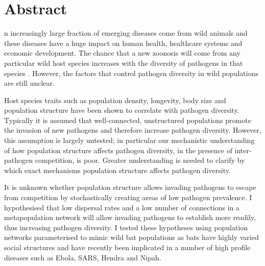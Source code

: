 










\section{Abstract}


n increasingly large fraction of emerging diseases come from wild animals and these diseases have a huge impact on human health, healthcare systems and economic development.
The chance that a new zoonosis will come from any particular wild host species increases with the diversity of pathogens in that species \cite{wolfe2000deforestation}.
However, the factors that control pathogen diversity in wild populations are still unclear.




Host species traits such as population density, longevity, body size and population structure have been shown to correlate with pathogen diversity.
Typically it is assumed that well-connected, unstructured populations promote the invasion of new pathogens and therefore increase pathogen diversity. %
However, this assumption is largely untested; in particular our mechanistic understanding of how population structure affects pathogen diversity, in the presence of inter-pathogen competition, is poor.
Greater understanding is needed to clarify by which exact mechanisms population structure affects pathogen diversity. 



It is unknown whether population structure allows invading pathogens to escape from competition by stochastically creating areas of low pathogen prevalence.
I hypothesised that low dispersal rates and a low number of connections in a metapopulation network will allow invading pathogens to establish more readily, thus increasing pathogen diversity. 
I tested these hypotheses using population networks parameterised to mimic wild bat populations as bats have highly varied social structures and have recently been implicated in a number of high profile diseases such as Ebola, SARS, Hendra and Nipah.

